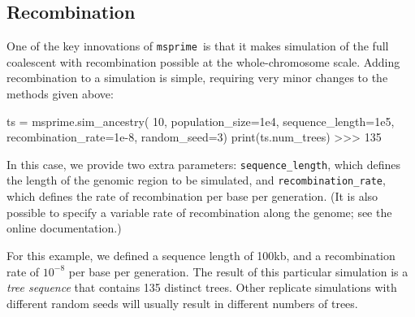 \documentclass[graybox]{svmult}
\newcommand{\msprime}[0]{\texttt{msprime}}
\begin{document}




\subsection{Recombination}\label{recombination}

One of the key innovations of \msprime\ is that it makes simulation of the
full coalescent with recombination possible at the whole-chromosome scale.
Adding recombination to a simulation is simple, requiring very minor
changes to the methods given above:

\begin{pythoncode}
ts = msprime.sim_ancestry(
    10, population_size=1e4, sequence_length=1e5,
    recombination_rate=1e-8, random_seed=3)
print(ts.num_trees)
>>> 135
\end{pythoncode}

In this case, we provide two extra parameters: \texttt{sequence\_length}, which
defines the length of the genomic region to be simulated, and
\texttt{recombination\_rate}, which defines the rate of recombination
per base per generation. (It is also possible to specify a variable
rate of recombination along the genome; see the online documentation.)

For this example, we defined a sequence length of 100kb, and a recombination rate of
\(10^{-8}\) per base per generation. The result of this particular simulation is a
\emph{tree sequence} that contains 135 distinct trees. Other replicate
simulations with different random seeds will usually result in different
numbers of trees.
\end{document}
